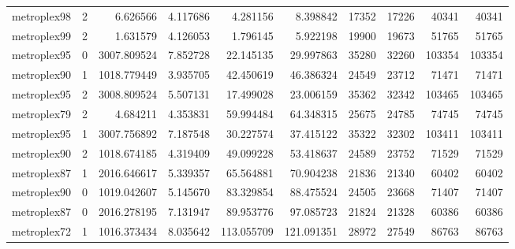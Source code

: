 \begin{longtable}{|l|r|r|r|r|r|r|r|r|r|}
metroplex98 & 2 & 6.626566 & 4.117686 & 4.281156 & 8.398842 & 17352 & 17226 & 40341 & 40341 \\
metroplex99 & 2 & 1.631579 & 4.126053 & 1.796145 & 5.922198 & 19900 & 19673 & 51765 & 51765 \\
metroplex95 & 0 & 3007.809524 & 7.852728 & 22.145135 & 29.997863 & 35280 & 32260 & 103354 & 103354 \\
metroplex90 & 1 & 1018.779449 & 3.935705 & 42.450619 & 46.386324 & 24549 & 23712 & 71471 & 71471 \\
metroplex95 & 2 & 3008.809524 & 5.507131 & 17.499028 & 23.006159 & 35362 & 32342 & 103465 & 103465 \\
metroplex79 & 2 & 4.684211 & 4.353831 & 59.994484 & 64.348315 & 25675 & 24785 & 74745 & 74745 \\
metroplex95 & 1 & 3007.756892 & 7.187548 & 30.227574 & 37.415122 & 35322 & 32302 & 103411 & 103411 \\
metroplex90 & 2 & 1018.674185 & 4.319409 & 49.099228 & 53.418637 & 24589 & 23752 & 71529 & 71529 \\
metroplex87 & 1 & 2016.646617 & 5.339357 & 65.564881 & 70.904238 & 21836 & 21340 & 60402 & 60402 \\
metroplex90 & 0 & 1019.042607 & 5.145670 & 83.329854 & 88.475524 & 24505 & 23668 & 71407 & 71407 \\
metroplex87 & 0 & 2016.278195 & 7.131947 & 89.953776 & 97.085723 & 21824 & 21328 & 60386 & 60386 \\
metroplex72 & 1 & 1016.373434 & 8.035642 & 113.055709 & 121.091351 & 28972 & 27549 & 86763 & 86763 \\
\end{longtable}
